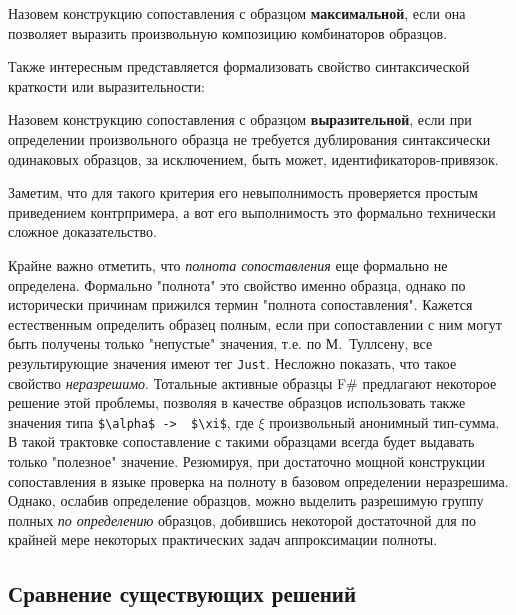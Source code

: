 \begin{definition}[Максимальность]
Назовем конструкцию сопоставления с образцом \textbf{максимальной}, если она позволяет выразить произвольную композицию комбинаторов образцов.
\end{definition}

Также интересным представляется формализовать свойство синтаксической краткости или выразительности:

\begin{definition}[Выразительность]
Назовем конструкцию сопоставления с образцом \textbf{выразительной}, если при определении произвольного образца не требуется дублирования синтаксически одинаковых образцов, за исключением, быть может, идентификаторов-привязок.
\end{definition}

Заметим, что для такого критерия его невыполнимость проверяется простым приведением контрпримера, а вот его выполнимость это формально технически сложное доказательство.

Крайне важно отметить, что \textit{полнота сопоставления} еще формально не определена. Формально "полнота" это свойство именно образца, однако по исторически причинам прижился термин "полнота сопоставления". Кажется естественным определить образец полным, если при сопоставлении с ним могут быть получены только "непустые" значения, т.е. по М.~Туллсену, все результирующие значения имеют тег \lstinline|Just|. Несложно показать, что такое свойство \textit{неразрешимо}. Тотальные активные образцы F\# предлагают некоторое решение этой проблемы, позволяя в качестве образцов использовать также значения типа \lstinline|$\alpha$ ->  $\xi$|, где $\xi$ произвольный анонимный тип-сумма. В такой трактовке сопоставление с такими образцами всегда будет выдавать только "полезное" значение. Резюмируя, при достаточно мощной конструкции сопоставления в языке проверка на полноту в базовом определении неразрешима. Однако, ослабив определение образцов, можно выделить разрешимую группу полных \textit{по определению} образцов, добившись некоторой достаточной для по крайней мере некоторых практических задач аппроксимации полноты.


\subsection{Сравнение существующих решений}

